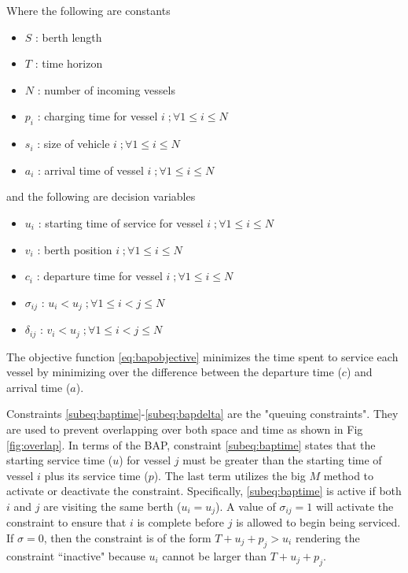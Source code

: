 \documentclass[letterpaper, 10pt, conference]{IEEEtran}
\begin{document}
\noindent
Where the following are constants

\begin{itemize}
	\item \(S\)   : berth length
	\item \(T\)   : time horizon
	\item \(N\)   : number of incoming vessels
	\item \(p_i\) : charging time for vessel \(i\;; \forall 1 \leq i \leq N\)
	\item \(s_i\) : size of vehicle \(i\;; \forall 1 \leq i \leq N\)
	\item \(a_i\) : arrival time of vessel \(i\;; \forall 1 \leq i \leq N\)
\end{itemize}

\noindent
and the following are decision variables

\begin{itemize}
    \item \(u_i\)         : starting time of service for vessel \(i\;; \forall 1 \leq i \leq N\)
    \item \(v_i\)         : berth position \(i\;; \forall 1 \leq i \leq N\)
    \item \(c_i\)         : departure time for vessel \(i\;; \forall 1 \leq i \leq N\)
    \item \(\sigma_{ij}\) : \(u_i < u_j\;; \forall 1 \leq i < j \leq N\)
    \item \(\delta_{ij}\) : \(v_i < u_j\;; \forall 1 \leq i < j \leq N\)
\end{itemize}

The objective function \eqref{eq:bapobjective} minimizes the time spent to service each vessel by minimizing over the difference between the departure time (\(c\)) and arrival time (\(a\)). 

Constraints \ref{subeq:baptime}-\ref{subeq:bapdelta} are the "queuing constraints". They are used to prevent overlapping over both space and time as shown in Fig \ref{fig:overlap}. In terms of the BAP, constraint \eqref{subeq:baptime} states that the starting service time (\(u\)) for vessel \(j\) must be greater than the starting time of vessel \(i\) plus its service time (\(p\)). The last term utilizes the big \(M\) method to activate or deactivate the constraint. Specifically, \eqref{subeq:baptime} is active if both \(i\) and \(j\) are visiting the same berth (\(u_i = u_j\)). A value of \(\sigma_{ij} = 1\) will activate the constraint to ensure that \(i\) is complete before \(j\) is allowed to begin being serviced. If \(\sigma = 0\), then the constraint is of the form \(T + u_j + p_j > u_i\) rendering the constraint ``inactive" because \(u_i\) cannot be larger than \(T + u_j + p_j\).
\end{document}
